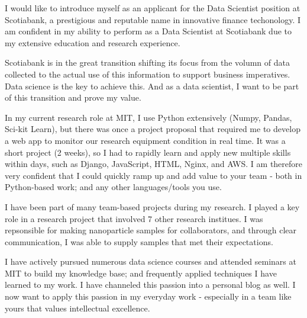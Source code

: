 \documentclass[11pt, letterpaper]{awesome-cv}
\begin{document}
\begin{cvletter}



I would like to introduce myself as an applicant for the Data Scientist position
at Scotiabank, a prestigious and reputable name in innovative finance
techonology. I am confident in my ability to perform as a Data Scientist at
Scotiabank due to my extensive education and research experience.



Scotiabank is in the great transition shifting its focus from the volumn of data
collected to the actual use of this information to support business
imperatives. Data science is the key to achieve this. And as a data scientist, I
want to be part of this transition and prove my value.


In my current research role at MIT, I use Python extensively (Numpy, Pandas, Sci-kit
Learn), but there was once a project proposal that required me to develop a web
app to monitor our research equipment condition in real time. It was a short
project (2 weeks), so I had to rapidly learn and apply new multiple skills
within days, such as Django, JavaScript, HTML, Nginx, and AWS. I am therefore
very confident that I could quickly ramp up and add value to your team - both in
Python-based work; and any other languages/tools you use.

I have been part of many team-based projects during my research. I played a key
role in a research project that involved 7 other research institues. I was
repsonsible for making nanoparticle samples for collaborators, and through clear
communication, I was able to supply samples that met their expectations.

I have actively pursued numerous data science courses and attended seminars at
MIT to build my knowledge base; and frequently applied techniques I have learned
to my work. I have channeled this passion into a personal blog as well. I now
want to apply this passion in my everyday work - especially in a team like yours
that values intellectual excellence.


\end{cvletter}


\makeletterclosing
\end{document}
